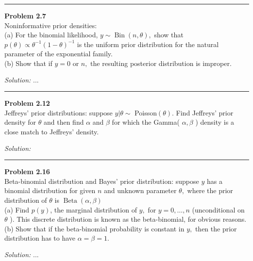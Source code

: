 \documentclass[a4paper, 11pt]{article}
\newenvironment{problem}[2][Problem]
    { \begin{mdframed}[backgroundcolor=gray!20] \textbf{#1 #2} \\}
    {  \end{mdframed}}
\newenvironment{solution}
    {\textit{Solution:}}
    {}
\begin{document}
\noindent\rule{7in}{2.8pt}


\begin{problem}{2.7}
  Noninformative prior densities:\\
  (a) For the binomial likelihood, $y \sim \operatorname{Bin}(n, \theta),$ show that $p(\theta) \propto \theta^{-1}(1-\theta)^{-1}$ is the uniform prior distribution for the natural parameter of the exponential family.\\
  (b) Show that if $y=0$ or $n,$ the resulting posterior distribution is improper.
\end{problem}
\begin{solution}
...
\end{solution}

\noindent\rule{7in}{2.8pt}


\begin{problem}{2.12}
Jeffreys' prior distributions: suppose $y | \theta \sim$ Poisson$(\theta) .$ Find Jeffreys' prior density for $\theta$ and then find $\alpha$ and $\beta$ for which the Gamma( $\alpha, \beta$ ) density is a close match to Jeffreys' density.
\end{problem}
\begin{solution}

\end{solution}

\noindent\rule{7in}{2.8pt}
\begin{problem}{2.16}
  Beta-binomial distribution and Bayes' prior distribution: suppose $y$ has a binomial distribution for given $n$ and unknown parameter $\theta,$ where the prior distribution of $\theta$ is $\operatorname{Beta}(\alpha, \beta)$\\
  (a) Find $p(y)$, the marginal distribution of $y,$ for $y=0, \ldots, n$ (unconditional on $\theta$ ). This discrete distribution is known as the beta-binomial, for obvious reasons.\\
  (b) Show that if the beta-binomial probability is constant in $y,$ then the prior distribution has to have $\alpha=\beta=1$.
\end{problem}
\begin{solution}
...
\end{solution}
\end{document}
